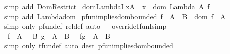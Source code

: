 \begin{isabellebody}
%
\isadelimproof
%
\endisadelimproof
%
\isatagproof
{}\isamarkupfalse%
{\isacharparenleft}simp\ add{\isacharcolon}\ Dom{\isacharunderscore}Restrict{\isacharparenright}%
\endisatagproof
{\isafoldproof}%
%
\isadelimproof
\isanewline
%
\endisadelimproof
\isanewline
{}\isamarkupfalse%
\ dom{\isacharunderscore}LambdaI{\isacharcolon}\isanewline
{\isachardoublequoteopen}{\isacharbrackleft}{\isacharbar}x{\isacharcolon}A{\isacharbar}{\isacharbrackright}\ {\isacharequal}{\isacharequal}{\isachargreater}\ x\ {\isacharcolon}\ dom\ {\isacharparenleft}Lambda\ A\ f{\isacharparenright}{\isachardoublequoteclose}\isanewline
%
\isadelimproof
%
\endisadelimproof
%
\isatagproof
{}\isamarkupfalse%
{\isacharparenleft}simp\ add{\isacharcolon}\ Lambda{\isacharunderscore}dom{\isacharparenright}%
\endisatagproof
{\isafoldproof}%
%
\isadelimproof
\isanewline
%
\endisadelimproof
\isanewline
\isanewline
{}\isamarkupfalse%
\ pfun{\isacharunderscore}implies{\isacharunderscore}dom{\isacharunderscore}bounded{\isacharcolon}\ {\isachardoublequoteopen}f\ {\isacharcolon}\ A\ {\isacharminus}{\isacharbar}{\isacharminus}{\isachargreater}\ B\ {\isasymLongrightarrow}\ dom\ f\ {\isasymsubseteq}\ A{\isachardoublequoteclose}\isanewline
%
\isadelimproof
%
\endisadelimproof
%
\isatagproof
{}\isamarkupfalse%
{\isacharparenleft}simp\ only{\isacharcolon}\ pfun{\isacharunderscore}def\ rel{\isacharunderscore}def{\isacharcomma}\ auto{\isacharparenright}%
\endisatagproof
{\isafoldproof}%
%
\isadelimproof
\ \isanewline
%
\endisadelimproof
\isanewline
\isanewline
{}\isamarkupfalse%
\ override{\isacharunderscore}tfunI{}{\isacharbrackleft}simp{\isacharbrackright}{\isacharcolon}\isanewline
{\isachardoublequoteopen}{\isasymlbrakk}\ f\ {\isacharcolon}\ A\ {\isacharminus}{\isacharminus}{\isacharminus}{\isachargreater}\ \ B{\isacharsemicolon}\ g\ {\isacharcolon}\ A\ {\isacharminus}{\isacharbar}{\isacharminus}{\isachargreater}\ B\ {\isasymrbrakk}\ {\isasymLongrightarrow}\ f{\isacharparenleft}{\isacharplus}{\isacharparenright}g\ {\isacharcolon}\ A\ {\isacharminus}{\isacharminus}{\isacharminus}{\isachargreater}\ B{\isachardoublequoteclose}\isanewline
%
\isadelimproof
%
\endisadelimproof
%
\isatagproof
{}\isamarkupfalse%
{\isacharparenleft}simp\ only{\isacharcolon}\ tfun{\isacharunderscore}def{\isacharcomma}\ auto\ dest{\isacharbang}{\isacharcolon}\ pfun{\isacharunderscore}implies{\isacharunderscore}dom{\isacharunderscore}bounded{\isacharparenright}%
\endisatagproof
{\isafoldproof}%
%
\isadelimproof
\isanewline

\end{isabellebody}
